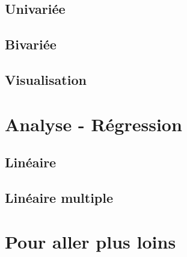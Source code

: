 \documentclass[10.5pt,a4paper]{article}
\begin{document}
  \subsection{Univariée}
  \subsection{Bivariée}
  \subsection{Visualisation}


\section{Analyse - Régression}
  \subsection{Linéaire}
  \subsection{Linéaire multiple}

  
\section{Pour aller plus loins}
 
%
%
\end{document}
